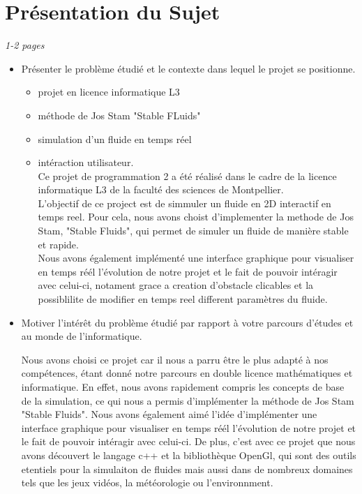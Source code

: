\documentclass[a4paper]{article}
\begin{document}
\section{Présentation du Sujet} %
\emph{1-2 pages}
\begin{itemize}%

\item Présenter le problème étudié et le contexte dans lequel le projet se positionne.
    \begin{itemize}
        \item projet en licence informatique L3
        \item méthode de Jos Stam "Stable FLuids"
        \item simulation d'un fluide en temps réel
        \item intéraction utilisateur.\\
            {\color{WildStrawberry} Ce projet de programmation 2 a été réalisé dans le cadre de la licence informatique L3 
                de la faculté des sciences de Montpellier.\\
                L'objectif de ce project est de simmuler un fluide en 2D interactif en temps reel.
                Pour cela, nous avons choist d'implementer la methode
                de Jos Stam, "Stable Fluids", qui permet de simuler un 
                fluide de manière stable et rapide.\\
                Nous avons également implémenté une interface graphique pour 
                visualiser en temps réél l'évolution de notre projet et le fait 
                de pouvoir intéragir avec celui-ci, notament grace a creation 
                d'obstacle clicables et la possiblilite de modifier en temps reel 
                different paramètres du fluide.}
    \end{itemize}

\item Motiver l'intérêt du problème étudié par rapport à votre parcours d'études et au monde de l'informatique.

        {\color{red}Nous avons choisi ce projet car il nous a parru être le plus adapté à nos compétences, étant donné notre parcours
        en double licence mathématiques et informatique. En effet, nous avons rapidement compris les concepts de base de la simulation, ce qui nous
        a permis d'implémenter la méthode de Jos Stam "Stable Fluids". 
        Nous avons également aimé l'idée d'implémenter une interface graphique pour visualiser en temps réél l'évolution de notre projet et le fait de pouvoir intéragir avec celui-ci. 
        De plus, c'est avec ce projet que nous avons découvert le langage c++ et la bibliothèque OpenGl, qui sont des outils etentiels pour la simulaiton de fluides 
        mais aussi dans de nombreux domaines tels que les jeux vidéos, la météorologie ou l'environnment.}



\end{itemize}
\end{document}
